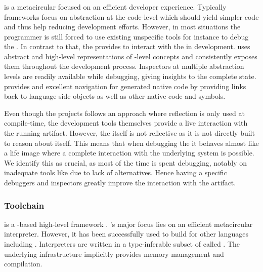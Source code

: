 \subsubsection*{\Maxine \Java \VM}
\Maxine is a metacircular \Java \VM \cite{Wimm13a} focused on an efficient developer experience.
Typically \VM frameworks focus on abstraction at the code-level which should yield simpler code and thus help reducing development efforts.
However, in most situations the programmer is still forced to use existing unspecific tools for instance to debug the \VM.
In contrast to that, the \Maxine \VM provides  to interact with the \VM in development.
\Maxine uses abstract and high-level representations of \VM-level concepts and consistently exposes them throughout the development process.
Inspectors at multiple abstraction levels are readily available while debugging, giving insights to the complete \VM state.
\Maxine provides and excellent navigation for generated native code by providing links back to language-side objects as well as other native code and symbols.

Even though the \Maxine projects follows an approach where reflection is only used at compile-time, the development tools themselves provide a live interaction with the running \VM artifact.
However, the \VM itself is not reflective as it is not directly built to reason about itself.
This means that when debugging the \VM it behaves almost like a life \ST image where a complete interaction with the underlying system is possible.
We identify this as crucial, as most of the time is spent debugging, notably on inadequate tools like  due to lack of alternatives.
Hence having a specific debuggers and inspectors greatly improve the interaction with the \VM artifact.

\subsubsection*{\PyPy Toolchain}
 is a \Python-based high-level \VM framework \cite{Rigo06a}.
\PyPy's major focus lies on an efficient metacircular \Python interpreter.
However, it has been successfully used to build \VMs for other languages including \ST \cite{Bolz08a}.
Interpreters are written in a type-inferable subset of \Python called \RPython.
The underlying \PyPy infrastructure implicitly provides memory management and \JIT compilation.


